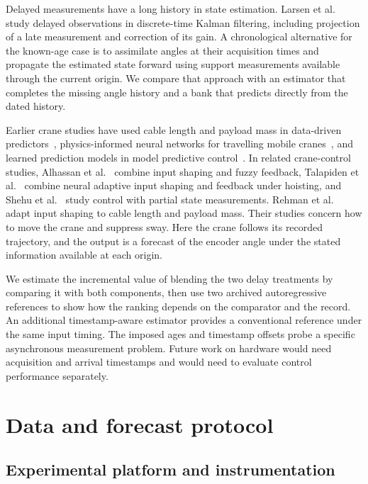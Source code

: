 Delayed measurements have a long history in state estimation. Larsen et al.~\cite{larsen1998} study delayed observations in discrete-time Kalman filtering, including projection of a late measurement and correction of its gain. A chronological alternative for the known-age case is to assimilate angles at their acquisition times and propagate the estimated state forward using support measurements available through the current origin. We compare that approach with an estimator that completes the missing angle history and a bank that predicts directly from the dated history.

Earlier crane studies have used cable length and payload mass in data-driven predictors~\cite{kusznir2022}, physics-informed neural networks for travelling mobile cranes~\cite{zhou2025}, and learned prediction models in model predictive control~\cite{kusznir2024mpc,mao2026}. In related crane-control studies, Alhassan et al.~\cite{alhassan2024control} combine input shaping and fuzzy feedback, Talapiden et al.~\cite{talapiden2026control} combine neural adaptive input shaping and feedback under hoisting, and Shehu et al.~\cite{shehu2026control} study control with partial state measurements. Rehman et al.~\cite{rehman2022} adapt input shaping to cable length and payload mass. Their studies concern how to move the crane and suppress sway. Here the crane follows its recorded trajectory, and the output is a forecast of the encoder angle under the stated information available at each origin.

We estimate the incremental value of blending the two delay treatments by comparing it with both components, then use two archived autoregressive references to show how the ranking depends on the comparator and the record. An additional timestamp-aware estimator provides a conventional reference under the same input timing. The imposed ages and timestamp offsets probe a specific asynchronous measurement problem. Future work on hardware would need acquisition and arrival timestamps and would need to evaluate control performance separately.

\section{Data and forecast protocol}
\label{sec:protocol}

\subsection{Experimental platform and instrumentation}


